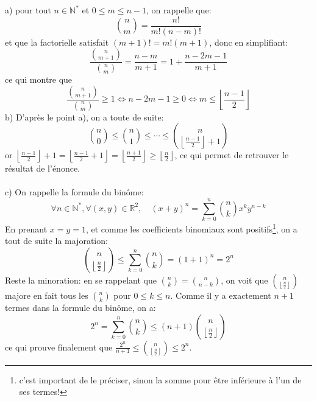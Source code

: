 a) pour tout $n\in\mathbb{N}^*$ et $0\leq m \leq n-1$, on rappelle que:
\[
\binom{n}{m} = \frac{n!}{m!(n-m)!}
\]
et que la factorielle satisfait $(m+1)!=m!(m+1)$, donc en simplifiant:
\[
\frac{\binom{n}{m+1} }{\binom{n}{m} } = \frac{n-m}{m+1} = 1+\frac{n-2m-1}{m+1}
\]
ce qui montre que 
\[
\frac{\binom{n}{m+1}}{\binom{n}{m}}  \geq 1 \Leftrightarrow n-2m-1 \geq 0 \Leftrightarrow  m \leq \left\lfloor \frac{n-1}{2} \right\rfloor
\]
b) D’après le point a), on a toute de suite:
\[
\binom{n}{0} \leq \binom{n}{1} \leq \cdots \leq \binom{n}{\left\lfloor \frac{n-1}{2} \right\rfloor+1}
\]
or $\left\lfloor \frac{n-1}{2} \right\rfloor+1 =  \left\lfloor \frac{n-1}{2} +1\right\rfloor = \left\lfloor \frac{n+1}{2} \right\rfloor \geq \left\lfloor \frac{n}{2} \right\rfloor$, ce qui permet de retrouver le résultat de l’énonce.\\ \\
c) On rappelle la formule du binôme: 
\[
\forall n \in \mathbb{N}^*, \forall (x,y)\in\mathbb{R}^2, \quad (x+y)^n=\sum_{k=0}^n{\binom{n}{k}x^ky^{n-k}} 
\]
En prenant $x=y=1$, et comme les coefficients binomiaux sont positifs\footnote{c'est important de le préciser, sinon la somme pour être inférieure à l'un de ses termes!}, on a tout de suite la majoration:
\[
\binom{n}{\left\lfloor \frac{n}{2} \right\rfloor} \leq \sum_{k=0}^n{\binom{n}{k}} = (1+1)^n = 2^n
\]
Reste la minoration: en se rappelant que $\binom{n}{k}=\binom{n}{n-k}$, on voit que $\binom{n}{\left\lfloor \frac{n}{2} \right\rfloor}$ majore en fait tous les $\binom{n}{k}$ pour $0\leq k \leq n$. Comme il y a exactement $n+1$ termes dans la formule du binôme, on a:
\[
2^n = \sum_{k=0}^n{\binom{n}{k}} \leq (n+1)\binom{n}{\left\lfloor \frac{n}{2} \right\rfloor}
\]
ce qui prouve finalement que $\frac{2^n}{n+1}\leq \binom{n}{\left\lfloor \frac{n}{2} \right\rfloor} \leq 2^n $.
